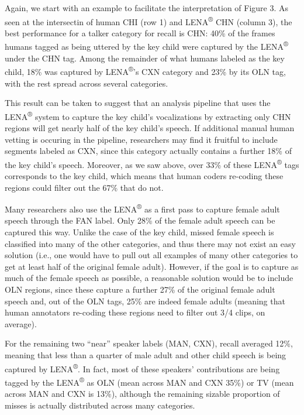 \documentclass[english,table,man,floatsintext]{apa6}
\begin{document}
Again, we start with an example to facilitate the interpretation of Figure 3. As seen at the intersectin of human CHI (row 1) and LENA\textsuperscript{®} CHN (column 3), the best performance for a talker category for recall is CHN: 40\% of the frames humans tagged as being uttered by the key child were captured by the LENA\textsuperscript{®} under the CHN tag. Among the remainder of what humans labeled as the key child, 18\% was captured by LENA\textsuperscript{®}'s CXN category and 23\% by its OLN tag, with the rest spread across several categories.

This result can be taken to suggest that an analysis pipeline that uses the LENA\textsuperscript{®} system to capture the key child's vocalizations by extracting only CHN regions will get nearly half of the key child's speech. If additional manual human vetting is occuring in the pipeline, researchers may find it fruitful to include segments labeled as CXN, since this category actually contains a further 18\% of the key child's speech. Moreover, as we saw above, over 33\% of these LENA\textsuperscript{®} tags corresponds to the key child, which means that human coders re-coding these regions could filter out the 67\% that do not.

Many researchers also use the LENA\textsuperscript{®} as a first pass to capture female adult speech through the FAN label. Only 28\% of the female adult speech can be captured this way. Unlike the case of the key child, missed female speech is classified into many of the other categories, and thus there may not exist an easy solution (i.e., one would have to pull out all examples of many other categories to get at least half of the original female adult). However, if the goal is to capture as much of the female speech as possible, a reasonable solution would be to include OLN regions, since these capture a further 27\% of the original female adult speech and, out of the OLN tags, 25\% are indeed female adults (meaning that human annotators re-coding these regions need to filter out 3/4 clips, on average).

For the remaining two \enquote{near} speaker labels (MAN, CXN), recall averaged 12\%, meaning that less than a quarter of male adult and other child speech is being captured by LENA\textsuperscript{®}. In fact, most of these speakers' contributions are being tagged by the LENA\textsuperscript{®} as OLN (mean across MAN and CXN 35\%) or TV (mean across MAN and CXN is 13\%), although the remaining sizable proportion of misses is actually distributed across many categories.
\end{document}
